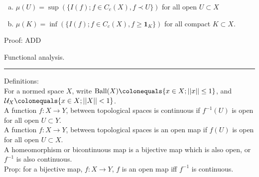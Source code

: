 \documentclass[12pt]{article}
\newcommand{\rarw}[0] { \rightarrow }
\newcommand{ \defeq }[0] { \colonequals }
\newcommand{ \cf }[1] { \mathbf{1}_{#1} }
\newcommand{\U}[0] { \mathcal{U} }
\newcommand{ \Ball } { \textrm{Ball} }
\begin{document}
\begin{enumerate}[a)]
\item
$\mu(U) = \sup \left( \{ I(f); f\in C_c(X), f \prec U  \} \right) $ for all open $U \subset X$
\item
$\mu(K) = \inf \left( \{ I(f); f \in C_c(X), f \ge \cf{K} \}\right) $ for all compact $K \subset X$.
\end{enumerate}

\noindent
Proof: ADD






















\break

\begin{flushleft}
Functional analysis. \\
\end{flushleft}

\begin{flushleft}
\addvspace{5pt} \hrule
\end{flushleft}	



Definitions: \\


\noindent
For a normed space $X$, write $\Ball(X) \defeq \{  x \in X; ||x|| \le 1 \}$, and $\U_X \defeq \{ x \in X; ||X|| < 1 \}$. \\

\noindent
A function $f:X \rarw Y$, between topological spaces is continuous if $f^{-1}(U)$ is open for all open $U \subset Y$. \\

\noindent
A function $f:X \rarw Y$, between topological spaces is an open map if $f(U)$ is open for all open $U \subset X$. \\

\noindent
A homeomorphism or bicontinuous map is a bijective map which is also open, or $f^{-1}$ is also continuous. \\


Prop: for a bijective map, $f:X \rarw Y$, $f$ is an open map iff $f^{-1}$ is continuous. \\

\end{document}
